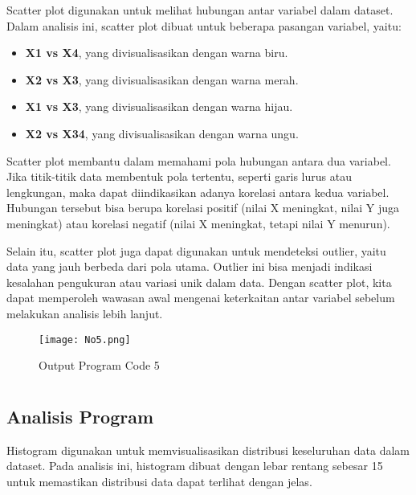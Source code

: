 \documentclass[
  course = {{Data Visualisasi dan Pemrosesan Citra}},
  assignment = 2,
  name = {{Dosen Pengampu Matkul 1 ; Dosen Pengampu Matkul 2}},
  studentnumber = {{ ; }},
  email = {{Prof. Dr. Suprijadi, M.Eng. ; Dr. Irfan Dwi Aditya, S.Si., M.Si.}},
  firstexercise = 1
]{aga-homework}
\begin{document}
Scatter plot digunakan untuk melihat hubungan antar variabel dalam dataset. Dalam analisis ini, scatter plot dibuat untuk beberapa pasangan variabel, yaitu:

\begin{itemize}
    \item \textbf{X1 vs X4}, yang divisualisasikan dengan warna biru.
    \item \textbf{X2 vs X3}, yang divisualisasikan dengan warna merah.
    \item \textbf{X1 vs X3}, yang divisualisasikan dengan warna hijau.
    \item \textbf{X2 vs X34}, yang divisualisasikan dengan warna ungu.
\end{itemize}

Scatter plot membantu dalam memahami pola hubungan antara dua variabel. Jika titik-titik data membentuk pola tertentu, seperti garis lurus atau lengkungan, maka dapat diindikasikan adanya korelasi antara kedua variabel. Hubungan tersebut bisa berupa korelasi positif (nilai X meningkat, nilai Y juga meningkat) atau korelasi negatif (nilai X meningkat, tetapi nilai Y menurun).  

Selain itu, scatter plot juga dapat digunakan untuk mendeteksi outlier, yaitu data yang jauh berbeda dari pola utama. Outlier ini bisa menjadi indikasi kesalahan pengukuran atau variasi unik dalam data. Dengan scatter plot, kita dapat memperoleh wawasan awal mengenai keterkaitan antar variabel sebelum melakukan analisis lebih lanjut.  


\exercise
\nolinenumbers
    
\linenumbers

\begin{figure}[h!]
    \centering
    \texttt{[image: No5.png]}
    \caption{Output Program Code 5}
    \label{fig:enter-label}
\end{figure}
\section{}
\subsection{Analisis Program}

Histogram digunakan untuk memvisualisasikan distribusi keseluruhan data dalam dataset. Pada analisis ini, histogram dibuat dengan lebar rentang sebesar 15 untuk memastikan distribusi data dapat terlihat dengan jelas.
\end{document}
